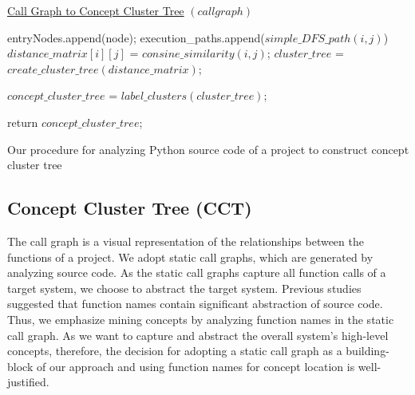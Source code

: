 \label{approach}

\begin{algorithm}
    
    \underline{Call Graph to Concept Cluster Tree} $(call graph)$\;
    
    {
        {
            entryNodes.append(node);
        }
    } 
    {
        {
            execution\_paths.append($simple\_DFS\_path(i, j)$)
        }
    }
    {
        {
            $distance\_matrix[i][j]$ = $consine\_similarity(i,j)$;
        }
    }
    $cluster\_tree$ = $create\_cluster\_tree(distance\_matrix)$;
    
    $concept\_cluster\_tree$ = $label\_clusters(cluster\_tree)$;
    
    return $concept\_cluster\_tree$;
    \caption{Our procedure for analyzing Python source code of a project to construct concept cluster tree}
    \label{alg:overall}
\end{algorithm}

\subsection{Concept Cluster Tree (CCT)}
\label{approach_cct}
The call graph is a visual representation of the relationships between the functions of a project. We adopt static call graphs, which are generated by analyzing source code. As the static call
graphs capture all function calls of a target system, we
choose to abstract the target system. Previous studies suggested that function names contain significant abstraction of source code. Thus, we emphasize mining concepts by analyzing function names in the static call graph.
As we want to capture and abstract the overall system's high-level concepts, therefore, the decision for adopting a static call graph as a building-block of our approach and using function names for concept location is well-justified.  

